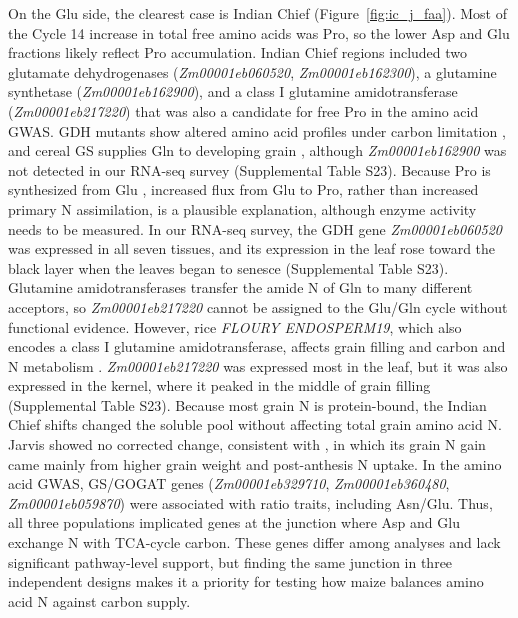 \documentclass[namedate,unnumsec,webpdf,contemporary,large]{oup-authoring-template}
\begin{document}
On the Glu side, the clearest case is Indian Chief (Figure~\ref{fig:ic_j_faa}). Most of the Cycle 14 increase in total free amino acids was Pro, so the lower Asp and Glu fractions likely reflect Pro accumulation. Indian Chief regions included two glutamate dehydrogenases (\textit{Zm00001eb060520}, \textit{Zm00001eb162300}), a glutamine synthetase (\textit{Zm00001eb162900}), and a class I glutamine amidotransferase (\textit{Zm00001eb217220}) that was also a candidate for free Pro in the amino acid GWAS. GDH mutants show altered amino acid profiles under carbon limitation \citep{Miyashita2008GDH, Dellero2020AminoNUE}, and cereal GS supplies Gln to developing grain \citep{Wei2021WheatGS, Fujita2022RiceGS13}, although \textit{Zm00001eb162900} was not detected in our RNA-seq survey (Supplemental Table S23). Because Pro is synthesized from Glu \citep{Alvarez2022ProHub}, increased flux from Glu to Pro, rather than increased primary N assimilation, is a plausible explanation, although enzyme activity needs to be measured. In our RNA-seq survey, the GDH gene \textit{Zm00001eb060520} was expressed in all seven tissues, and its expression in the leaf rose toward the black layer when the leaves began to senesce (Supplemental Table S23). Glutamine amidotransferases transfer the amide N of Gln to many different acceptors, so \textit{Zm00001eb217220} cannot be assigned to the Glu/Gln cycle without functional evidence. However, rice \textit{FLOURY ENDOSPERM19}, which also encodes a class I glutamine amidotransferase, affects grain filling and carbon and N metabolism \citep{Lou2021FLO19}. \textit{Zm00001eb217220} was expressed most in the leaf, but it was also expressed in the kernel, where it peaked in the middle of grain filling (Supplemental Table S23). Because most grain N is protein-bound, the Indian Chief shifts changed the soluble pool without affecting total grain amino acid N. Jarvis showed no corrected change, consistent with \citet{Moll1994}, in which its grain N gain came mainly from higher grain weight and post-anthesis N uptake. In the amino acid GWAS, GS/GOGAT genes (\textit{Zm00001eb329710}, \textit{Zm00001eb360480}, \textit{Zm00001eb059870}) were associated with ratio traits, including Asn/Glu. Thus, all three populations implicated genes at the junction where Asp and Glu exchange N with TCA-cycle carbon. These genes differ among analyses and lack significant pathway-level support, but finding the same junction in three independent designs makes it a priority for testing how maize balances amino acid N against carbon supply.
\end{document}

